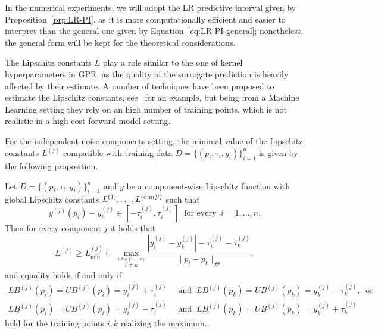 In the numerical experiments, we will adopt the LR predictive interval given by Proposition~\ref{prp:LR-PI}, as it is more computationally efficient and easier to interpret than the general one given by Equation~\eqref{eq:LR-PI-general}; nonetheless, the general form will be kept for the theoretical considerations. \medbreak

The Lipschitz constants $\underline L$ play a role similar to the one of kernel hyperparameters in GPR, as the quality of the surrogate prediction is heavily affected by their estimate.
A number of techniques have been proposed to estimate the Lipschitz constants, see~\cite{Calliess2017} for an example, but being from a Machine Learning setting they rely on an high number of training points, which is not realistic in a high-cost forward model setting.

For the independent noise components setting, the minimal value of the Lipschitz constants $L^{(j)}$ compatible with training data $D=\{ (p_i, \tau_i, y_i) \}_{i=1}^n$ is given by the following proposition.
\begin{prp} \label{prp:LR-const}
    Let $D=\{ (p_i, \tau_i, y_i) \}_{i=1}^n$ and $y$ be a component-wise Lipschitz function with global Lipschitz constants $L^{(1)},\dots, L^{(\text{dim}\mathcal Y)}$ such that 
    \[
        y^{(j)}(p_i) -y_i^{(j)} \in  [-\tau_i^{(j)},\tau_i^{(j)}] \ \text{ for every } \ i = 1, \dots, n.
    \]
    Then for every component $j$ it holds that
    \begin{equation}\label{eq:LR-const}
        L^{(j)} \geq L^{(j)}_{\min}\coloneq \max_{ \stackrel{i, k \in \{1, \dots, n\}}{i\neq k} } \frac{| y_i^{(j)} - y_k^{(j)} | - \tau_i^{(j)} - \tau_k^{(j)}}{\| p_i - p_k \|_\Theta},
    \end{equation}
    and equality holds if and only if
    \begin{equation}\label{eq:LR-const-minimality}
        \begin{aligned}
            LB^{(j)}(p_i) =UB^{(j)}(p_i) = y_i^{(j)} + \tau_i^{(j)}  \ &\text{ and }   \ LB^{(j)}(p_k) =UB^{(j)}(p_k) = y_k^{(j)} - \tau_k^{(j)}, \ \text{ or } \\
            LB^{(j)}(p_i) =UB^{(j)}(p_i) = y_i^{(j)} - \tau_i^{(j)}  \ &\text{ and }   \ LB^{(j)}(p_k) =UB^{(j)}(p_k) = y_k^{(j)} + \tau_k^{(j)}
        \end{aligned}
    \end{equation}
    hold for the training points $i,k$ realizing the maximum. 
\end{prp}

